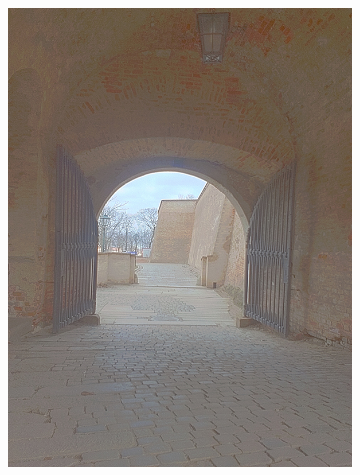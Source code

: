 \begin{figure}[h!]
\begin{subfigure}{0.3\textwidth}
      \includegraphics[width=\textwidth]{figures/tests/tmo/dur3}
  \end{subfigure}
  ~
  \begin{subfigure}{0.3\textwidth}

\end{subfigure}
\end{figure}
